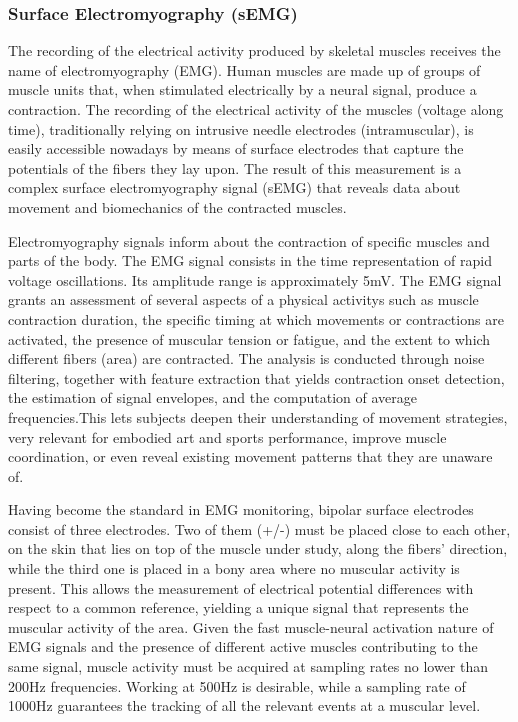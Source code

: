 \subsubsection{Surface Electromyography (sEMG)}
The recording of the electrical activity produced by skeletal muscles receives the name of electromyography (EMG). Human muscles are made up of groups of muscle units that, when stimulated electrically by a neural signal, produce a contraction. The recording of the electrical activity of the muscles (voltage along time), traditionally relying on intrusive needle electrodes (intramuscular), is easily accessible nowadays by means of surface electrodes that capture the potentials of the fibers they lay upon. The result of this measurement is a complex surface electromyography signal (sEMG) that reveals data about movement and biomechanics of the contracted muscles.

Electromyography signals inform about the contraction of specific muscles and parts of the body. The EMG signal consists in the time representation of rapid voltage oscillations. Its amplitude range is approximately 5mV. The EMG signal grants an assessment of several aspects of a physical activitys such as muscle contraction duration, the specific timing at which movements or contractions are activated, the presence of muscular tension or fatigue, and the extent to which different fibers (area) are contracted. The analysis is conducted through noise filtering, together with feature extraction that yields contraction onset detection, the estimation of signal envelopes, and the computation of average frequencies.This lets subjects deepen their understanding of movement strategies, very relevant for embodied art and sports performance, improve muscle coordination, or even reveal existing movement patterns that they are unaware of.


Having become the standard in EMG monitoring, bipolar surface electrodes consist of three electrodes. Two of them (+/-) must be placed close to each other, on the skin that lies on top of the muscle under study, along the fibers' direction, while the third one is placed in a bony area where no muscular activity is present. This allows the measurement of electrical potential differences with respect to a common reference, yielding a unique signal that represents the muscular activity of the area. Given the fast muscle-neural activation nature of EMG signals and the presence of different active muscles contributing to the same signal, muscle activity must be acquired at sampling rates no lower than 200Hz frequencies. Working at 500Hz is desirable, while a sampling rate of 1000Hz guarantees the tracking of all the relevant events at a muscular level.

